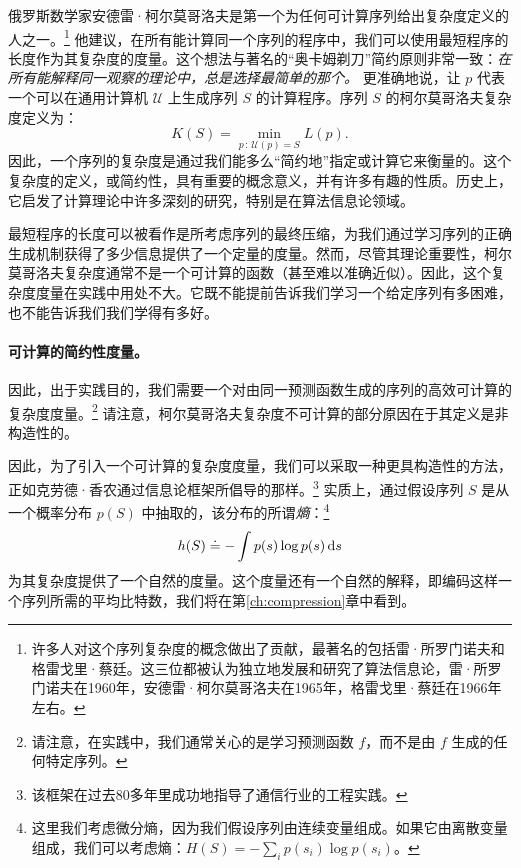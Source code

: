 \documentclass[../../book-main.tex]{subfiles}
\begin{document}
俄罗斯数学家安德雷·柯尔莫哥洛夫是第一个为任何可计算序列给出复杂度定义的人之一。\footnote{许多人对这个序列复杂度的概念做出了贡献，最著名的包括雷·所罗门诺夫和格雷戈里·蔡廷。这三位都被认为独立地发展和研究了算法信息论，雷·所罗门诺夫在1960年，安德雷·柯尔莫哥洛夫在1965年\cite{Kolmogorov1998OnTO}，格雷戈里·蔡廷在1966年左右\cite{Chaitin-1966}。} 他建议，在所有能计算同一个序列的程序中，我们可以使用最短程序的长度作为其复杂度的度量。这个想法与著名的“奥卡姆剃刀”简约原则非常一致：{\em 在所有能解释同一观察的理论中，总是选择最简单的那个。} 更准确地说，让 $p$ 代表一个可以在通用计算机 $\mathcal{U}$ 上生成序列 $S$ 的计算程序。序列 $S$ 的柯尔莫哥洛夫复杂度定义为：
\begin{equation}
    K(S) = \min_{p\,:\, \mathcal{U}(p) = S} L(p). 
\end{equation}
因此，一个序列的复杂度是通过我们能多么“简约地”指定或计算它来衡量的。这个复杂度的定义，或简约性，具有重要的概念意义，并有许多有趣的性质。历史上，它启发了计算理论中许多深刻的研究，特别是在算法信息论领域。

最短程序的长度可以被看作是所考虑序列的最终压缩，为我们通过学习序列的正确生成机制获得了多少信息提供了一个定量的度量。然而，尽管其理论重要性，柯尔莫哥洛夫复杂度通常不是一个可计算的函数\cite{Cover-Thomas}（甚至难以准确近似）。因此，这个复杂度度量在实践中用处不大。它既不能提前告诉我们学习一个给定序列有多困难，也不能告诉我们我们学得有多好。






\paragraph{可计算的简约性度量。}
因此，出于实践目的，我们需要一个对由同一预测函数生成的序列的高效可计算的复杂度度量。\footnote{请注意，在实践中，我们通常关心的是学习预测函数 $f$，而不是由 $f$ 生成的任何特定序列。} 请注意，柯尔莫哥洛夫复杂度不可计算的部分原因在于其定义是非构造性的。

因此，为了引入一个可计算的复杂度度量，我们可以采取一种更具构造性的方法，正如克劳德·香农通过信息论框架\cite{Shannon-1948,Cover-Thomas}所倡导的那样。\footnote{该框架在过去80多年里成功地指导了通信行业的工程实践。} 实质上，通过假设序列 $S$ 是从一个概率分布 $p(S)$ 中抽取的，该分布的所谓{\em 熵}：\footnote{这里我们考虑微分熵，因为我们假设序列由连续变量组成。如果它由离散变量组成，我们可以考虑熵：$H(S) = - \sum_{i}p(s_i) \log p(s_i)$。}
\begin{equation}
    h(S) \doteq -\int p(s) \log p(s) \odif{s}
    \label{eqn:entropy-definition}
\end{equation}
为其复杂度提供了一个自然的度量。这个度量还有一个自然的解释，即编码这样一个序列所需的平均比特数，我们将在第\ref{ch:compression}章中看到。
\end{document}
